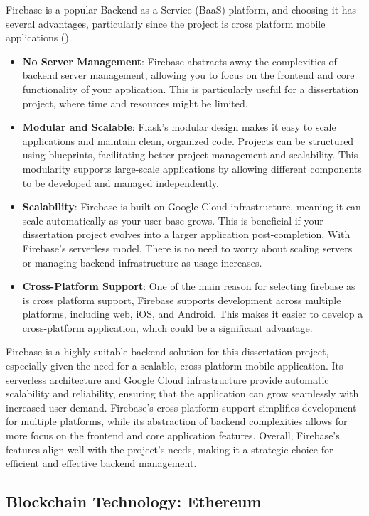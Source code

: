 Firebase is a popular Backend-as-a-Service (BaaS) platform, and choosing it has  several advantages, particularly since the project is cross platform mobile applications (\cite{firebase}). 

\begin{itemize}
    \item \textbf{No Server Management}: Firebase abstracts away the complexities of backend server management, allowing you to focus on the frontend and core functionality of your application. This is particularly useful for a dissertation project, where time and resources might be limited.
    \item \textbf{Modular and Scalable}: Flask's modular design makes it easy to scale applications and maintain clean, organized code. Projects can be structured using blueprints, facilitating better project management and scalability. This modularity supports large-scale applications by allowing different components to be developed and managed independently.
    \item \textbf{Scalability}: Firebase is built on Google Cloud infrastructure, meaning it can scale automatically as your user base grows. This is beneficial if your dissertation project evolves into a larger application post-completion, With Firebase’s serverless model, There is no need to worry about scaling servers or managing backend infrastructure as usage increases.
    \item \textbf{Cross-Platform Support}: One of the main reason for selecting firebase as is cross platform support, Firebase supports development across multiple platforms, including web, iOS, and Android. This makes it easier to develop a cross-platform application, which could be a significant advantage.
\end{itemize}
Firebase is a highly suitable backend solution for this dissertation project, especially given the need for a scalable, cross-platform mobile application. Its serverless architecture and Google Cloud infrastructure provide automatic scalability and reliability, ensuring that the application can grow seamlessly with increased user demand. Firebase’s cross-platform support simplifies development for multiple platforms, while its abstraction of backend complexities allows for more focus on the frontend and core application features. Overall, Firebase’s features align well with the project's needs, making it a strategic choice for efficient and effective backend management.

\subsection{Blockchain Technology: Ethereum}

